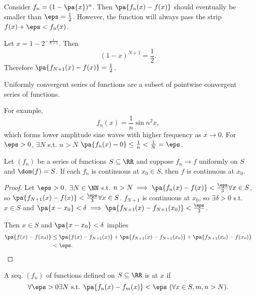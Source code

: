 \documentclass[11pt]{scrartcl}
\numberwithin{equation}{section}
\begin{document}
\begin{example}
    Consider $f_n=(1-\pa{x})^n$. Then $\pa{f_n(x)-f(x)}$ should 
    eventually be smaller than $\eps=\frac{1}{2}$. However, 
    the function will always pass the strip $f(x)+\eps<f_n(x)$.

    Let $x=1-2^{-\frac{1}{N+1}}$. Then 
    \[
        (1-x)^{N+1}=\frac{1}{2}.
    \]
    Therefore $\pa{f_{N+1}(x)-f(x)}=\frac{1}{2}$.
\end{example}
Uniformly convergent series of functions are a subset of pointwise convergent series
of functions. 

\begin{example}
    For example, 
    \[
        f_n(x)=\frac{1}{n}\sin n^2x,
    \]
    which forms lower amplitude sine waves with higher frequency
    as $x\to 0$.
    For $\eps>0$, $\exists N$ s.t. $n>N$
    $\pa{f_n(x)-0}\leq \frac{1}{n}<\frac{1}{N}=\eps$.
\end{example}

\begin{theorem}
    Let $(f_n)$ be a series of functions $S \subseteq\RR$ and suppose 
    $f_n\to f$ uniformly on $S$ and $\dom(f)=S$.
    If each $f_n$ is continuous at $x_0\in S$, then $f$ is continuous
    at $x_0$.
\end{theorem}

\begin{proof}
    Let $\eps>0$. $\exists N\in\NN$ s.t. $n>N\implies \pa{f_n(x)-f(x)}<\frac{\eps}{3}\forall x\in S$, so $\pa{f_{N+1}(x)-f(x)}<\frac{\eps}{3}\forall x\in S$. $f_{N+1}$ is continuous at $x_0$, so 
    $\exists\delta>0$ s.t. $x\in S$ and $\pa{x-x_0}<\delta\implies
    \pa{f_{N+1}(x)-f_{N+1}(x_0)}<\frac{\eps}{3}$.

    Then $x\in S$ and $\pa{x-x_0}<\delta$ implies 
    \begin{align*}
        \pa{f(x)-f(x_0)}&\leq \pa{f(x)-f_{N+1}(x)} + \pa{f_{N+1}(x)-f_{N+1}(x_0)}  + \pa{f_{N+1}(x_0)-f(x_0)} \\
        &< \eps.\qedhere
    \end{align*}
\end{proof}

\begin{definition}
    A seq. $(f_n)$ of functions defined on $S \subseteq\RR$ is 
     at $x$ if 
    \[
        \forall \eps>0 \exists N \text{ s.t. } \pa{f_n(x)-f_m(x)}<\eps \ 
        (\forall x\in S, m,n>N).
    \]
\end{definition}
\end{document}
